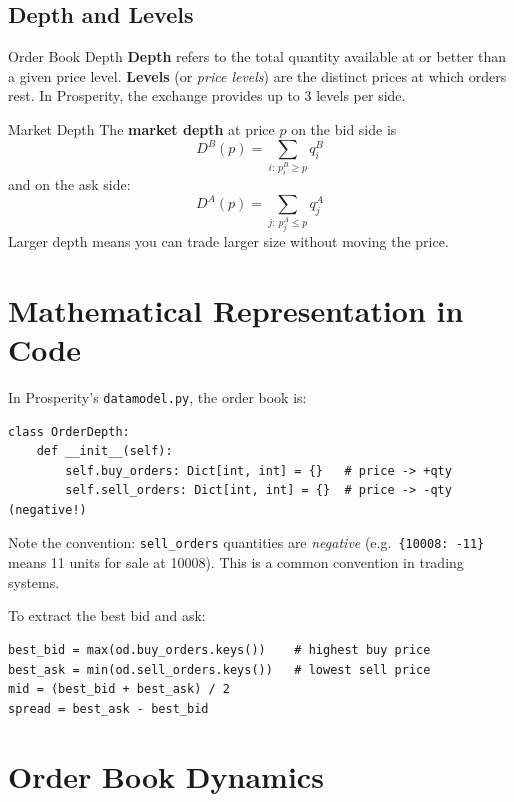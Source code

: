 \documentclass[12pt,a4paper,openany]{report}
\theoremstyle{definition}
\begin{document}
\subsection{Depth and Levels}

\begin{definitionbox}{Order Book Depth}
\textbf{Depth} refers to the total quantity available at or better than a given price level. \textbf{Levels} (or \emph{price levels}) are the distinct prices at which orders rest. In Prosperity, the exchange provides up to 3 levels per side.
\end{definitionbox}

\begin{definitionbox}{Market Depth}
The \textbf{market depth} at price $p$ on the bid side is
\[
  D^B(p) = \sum_{i:\, p_i^B \geq p} q_i^B
\]
and on the ask side:
\[
  D^A(p) = \sum_{j:\, p_j^A \leq p} q_j^A
\]
Larger depth means you can trade larger size without moving the price.
\end{definitionbox}

\section{Mathematical Representation in Code}

In Prosperity's \texttt{datamodel.py}, the order book is:
\begin{lstlisting}[caption={OrderDepth class from datamodel.py}]
class OrderDepth:
    def __init__(self):
        self.buy_orders: Dict[int, int] = {}   # price -> +qty
        self.sell_orders: Dict[int, int] = {}  # price -> -qty (negative!)
\end{lstlisting}

\noindent Note the convention: \texttt{sell\_orders} quantities are \emph{negative} (e.g.\ \texttt{\{10008: -11\}} means 11 units for sale at 10008). This is a common convention in trading systems.

To extract the best bid and ask:
\begin{lstlisting}[caption={Extracting best bid and ask from the order book}]
best_bid = max(od.buy_orders.keys())    # highest buy price
best_ask = min(od.sell_orders.keys())   # lowest sell price
mid = (best_bid + best_ask) / 2
spread = best_ask - best_bid
\end{lstlisting}

\section{Order Book Dynamics}
\end{document}
